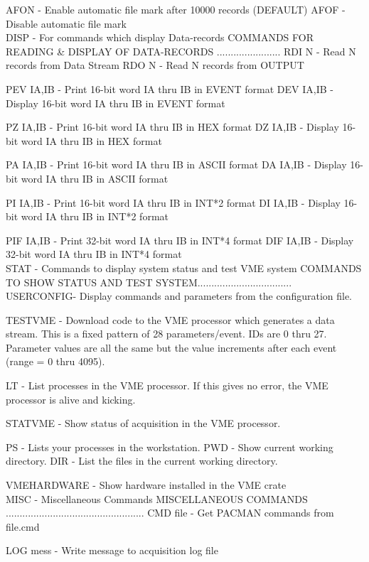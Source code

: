    AFON      - Enable automatic file mark after 10000 records (DEFAULT)
   AFOF      - Disable automatic file mark
   $$$$DISP - For commands which display Data-records
   COMMANDS FOR READING & DISPLAY OF DATA-RECORDS .......................
   RDI  N    - Read    N records from Data Stream
   RDO  N    - Read    N records from OUTPUT
 
   PEV IA,IB - Print   16-bit word IA thru IB in EVENT format
   DEV IA,IB - Display 16-bit word IA thru IB in EVENT format
 
   PZ  IA,IB - Print   16-bit word IA thru IB in HEX   format
   DZ  IA,IB - Display 16-bit word IA thru IB in HEX   format
 
   PA  IA,IB - Print   16-bit word IA thru IB in ASCII format
   DA  IA,IB - Display 16-bit word IA thru IB in ASCII format
 
   PI  IA,IB - Print   16-bit word IA thru IB in INT*2 format
   DI  IA,IB - Display 16-bit word IA thru IB in INT*2 format
 
   PIF IA,IB - Print   32-bit word IA thru IB in INT*4 format
   DIF IA,IB - Display 32-bit word IA thru IB in INT*4 format
   $$$$STAT - Commands to display system status and test VME system
   COMMANDS TO SHOW STATUS AND TEST SYSTEM..................................
   USERCONFIG- Display commands and parameters from the configuration
               file.
 
   TESTVME   - Download code to the VME processor which generates a data
               stream.  This is a fixed pattern of 28 parameters/event.
               IDs are 0 thru 27.  Parameter values are all the same but
               the value increments after each event (range = 0 thru 4095).
 
   LT        - List processes in the VME processor.  If this gives no
               error, the VME processor is alive and kicking.
 
   STATVME   - Show status of acquisition in the VME processor.
 
   PS        - Lists your processes in the workstation.
   PWD       - Show current working directory.
   DIR       - List the files in the current working directory.
 
   VMEHARDWARE - Show hardware installed in the VME crate
   $$$$MISC - Miscellaneous Commands
   MISCELLANEOUS COMMANDS ..................................................
   CMD file  - Get PACMAN commands from file.cmd
 
   LOG mess  - Write message to acquisition log file
 
